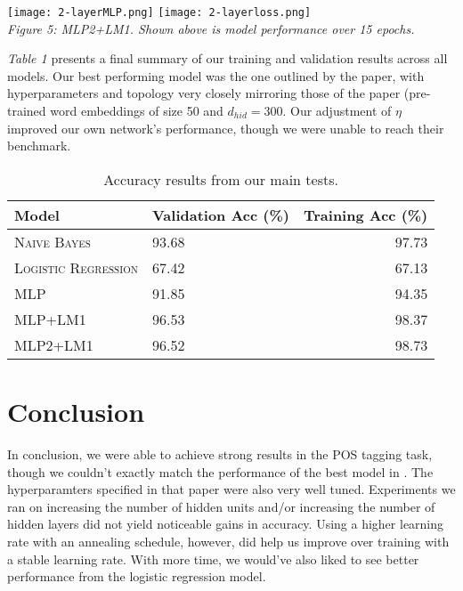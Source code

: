\documentclass[11pt]{article}
\begin{document}
{{\begin{center}
    \texttt{[image: 2-layerMLP.png]}
    \texttt{[image: 2-layerloss.png]}\\
    \textit{Figure 5: MLP2+LM1. Shown above is model performance over 15 epochs.}
\end{center}

\textit{Table 1} presents a final summary of our training and validation results across all models. Our best performing model was the one outlined by the \cite{collobert2011natural} paper, with hyperparameters and topology very closely mirroring those of the paper (pre-trained word embeddings of size 50 and $d_{hid} = 300$. Our adjustment of $\eta$ improved our own network's performance, though we were unable to reach their benchmark.

\begin{table}[h]
\centering
\begin{tabular}{llr}
 \toprule
 Model & Validation Acc (\%) & Training Acc (\%) \\
 \midrule
 \textsc{Naive Bayes} & 93.68 & 97.73 \\
 \textsc{Logistic Regression} & 67.42 & 67.13\\
 \textsc{MLP} & 91.85 & 94.35\\
 \textsc{MLP+LM1} & 96.53 & 98.37\\
 \textsc{MLP2+LM1} & 96.52 & 98.73\\
 \bottomrule
\end{tabular}
\caption{\label{tab:results} Accuracy results from our main tests.}
\end{table}

\section{Conclusion}

In conclusion, we were able to achieve strong results in the POS tagging task, though we couldn't exactly match the performance of the best model in \cite{collobert2011natural}. The hyperparamters specified in that paper were also very well tuned. Experiments we ran on increasing the number of hidden units and/or increasing the number of hidden layers did not yield noticeable gains in accuracy. Using a higher learning rate with an annealing schedule, however, did help us improve over training with a stable learning rate. With more time, we would've also liked to see better performance from the logistic regression model.

}}
\end{document}
